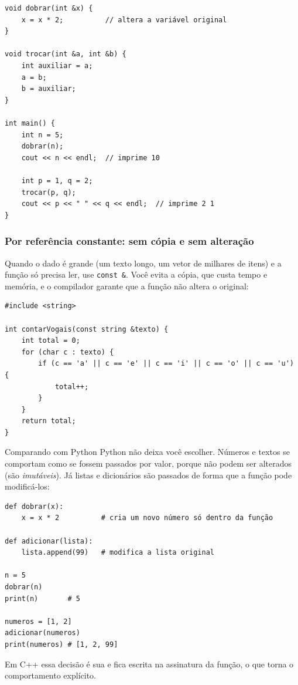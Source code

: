 \begin{codigo}
\begin{Verbatim}[breaklines=true, breaksymbolleft={}, fontsize=\footnotesize]
void dobrar(int &x) {
    x = x * 2;          // altera a variável original
}

void trocar(int &a, int &b) {
    int auxiliar = a;
    a = b;
    b = auxiliar;
}

int main() {
    int n = 5;
    dobrar(n);
    cout << n << endl;  // imprime 10

    int p = 1, q = 2;
    trocar(p, q);
    cout << p << " " << q << endl;  // imprime 2 1
}
\end{Verbatim}
\end{codigo}

\subsubsection{Por referência constante: sem cópia e sem alteração}

Quando o dado é grande (um texto longo, um vetor de milhares de itens) e a função só precisa ler, use \texttt{const}~\texttt{\&}. Você evita a cópia, que custa tempo e memória, e o compilador garante que a função não altera o original:

\begin{codigo}
\begin{Verbatim}[breaklines=true, breaksymbolleft={}, fontsize=\footnotesize]
#include <string>

int contarVogais(const string &texto) {
    int total = 0;
    for (char c : texto) {
        if (c == 'a' || c == 'e' || c == 'i' || c == 'o' || c == 'u') {
            total++;
        }
    }
    return total;
}
\end{Verbatim}
\end{codigo}

\begin{destaque}{Comparando com Python}
Python não deixa você escolher. Números e textos se comportam como se fossem passados por valor, porque não podem ser alterados (são \textit{imutáveis}). Já listas e dicionários são passados de forma que a função pode modificá-los:

\begin{codigo}
\begin{Verbatim}[breaklines=true, breaksymbolleft={}, fontsize=\footnotesize]
def dobrar(x):
    x = x * 2          # cria um novo número só dentro da função

def adicionar(lista):
    lista.append(99)   # modifica a lista original

n = 5
dobrar(n)
print(n)       # 5

numeros = [1, 2]
adicionar(numeros)
print(numeros) # [1, 2, 99]
\end{Verbatim}
\end{codigo}

Em C++ essa decisão é sua e fica escrita na assinatura da função, o que torna o comportamento explícito.
\end{destaque}

